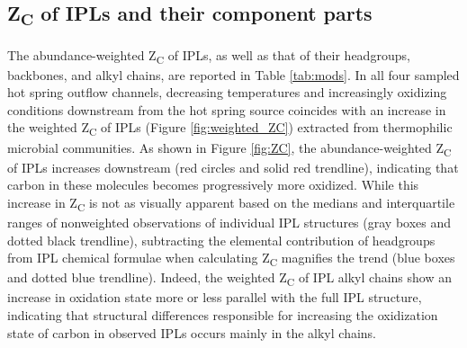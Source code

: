 
\subsection{Z\textsubscript{C} of IPLs and their component parts}
The abundance-weighted Z\textsubscript{C} of IPLs, as well as that of their headgroups, backbones, and alkyl chains, are reported in Table \ref{tab:mods}. In all four sampled hot spring outflow channels, decreasing temperatures and increasingly oxidizing conditions downstream from the hot spring source coincides with an increase in the weighted Z\textsubscript{C} of IPLs (Figure \ref{fig:weighted_ZC}) extracted from thermophilic microbial communities. As shown in Figure \ref{fig:ZC}, the abundance-weighted Z\textsubscript{C} of IPLs increases downstream (red circles and solid red trendline), indicating that carbon in these molecules becomes progressively more oxidized. While this increase in Z\textsubscript{C} is not as visually apparent based on the medians and interquartile ranges of nonweighted observations of individual IPL structures (gray boxes and dotted black trendline), subtracting the elemental contribution of headgroups from IPL chemical formulae when calculating Z\textsubscript{C} magnifies the trend (blue boxes and dotted blue trendline). Indeed, the weighted Z\textsubscript{C} of IPL alkyl chains show an increase in oxidation state more or less parallel with the full IPL structure, indicating that structural differences responsible for increasing the oxidization state of carbon in observed IPLs occurs mainly in the alkyl chains.

